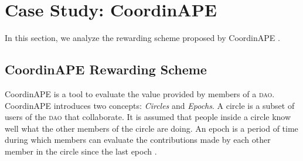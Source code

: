 \newpage
\section{Case Study: CoordinAPE}

%
In this section, we analyze the rewarding scheme proposed by CoordinAPE \cite{noauthor_coordinape_2022}.

\subsection{CoordinAPE Rewarding Scheme}

CoordinAPE is a tool to evaluate the value provided by members of a \textsc{dao}.
CoordinAPE introduces two concepts: \emph{Circles} and \emph{Epochs}.
A circle is a subset of users of the \textsc{dao} that collaborate.
It is assumed that people inside a circle know well what the other members of the circle are doing.
An epoch is a period of time during which members can evaluate the contributions made by each other member in the circle since the last epoch%
.

